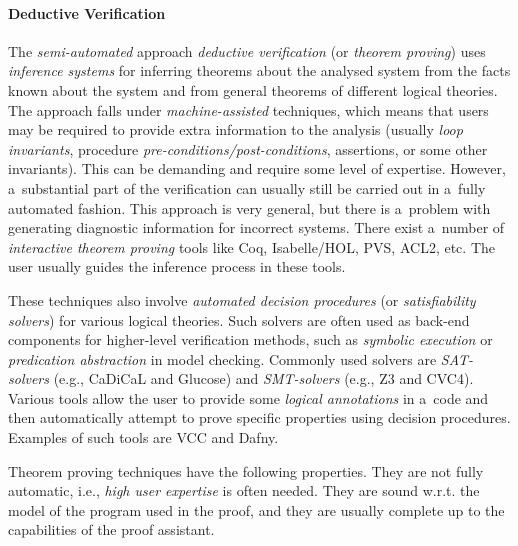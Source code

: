\paragraph{Deductive Verification}
The \emph{semi-automated} approach \emph{deductive verification} (or \emph{theorem proving}) uses \emph{inference systems} for inferring theorems about the analysed system from the facts known about the system and from general theorems of different logical theories. The approach falls under \emph{machine-assisted} techniques, which means that users may be required to provide extra information to the analysis (usually \emph{loop invariants}, procedure \emph{pre-conditions/post-conditions}, assertions, or some other invariants). This can be demanding and require some level of expertise. However, a~substantial part of the verification can usually still be carried out in a~fully automated fashion. This approach is very general, but there is a~problem with generating diagnostic information for incorrect systems. There exist a~number of \emph{interactive theorem proving} tools like Coq, Isabelle/HOL, PVS, ACL2, etc. The user usually guides the inference process in these tools.

These techniques also involve \emph{automated decision procedures} (or \emph{satisfiability solvers}) for various logical theories. Such solvers are often used as back-end components for higher-level verification methods, such as \emph{symbolic execution} or \emph{predication abstraction} in model checking. Commonly used solvers are \emph{SAT-solvers} (e.g., CaDiCaL and Glucose) and \emph{SMT-solvers} (e.g., Z3 and CVC4). Various tools allow the user to provide some \emph{logical annotations} in a~code and then automatically attempt to prove specific properties using decision procedures. Examples of such tools are VCC and Dafny.

Theorem proving techniques have the following properties. They are not fully automatic, i.e., \emph{high user expertise} is often needed. They are sound w.r.t. the model of the program used in the proof, and they are usually complete up to the capabilities of the proof assistant.

